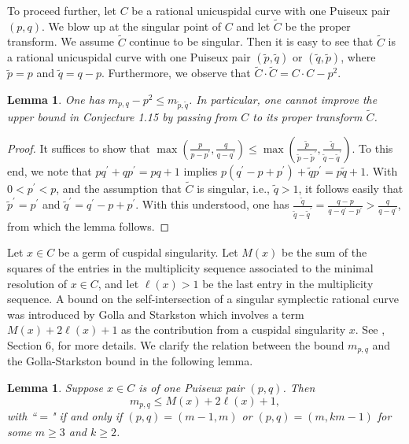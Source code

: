 \documentclass[11pt]{amsart}
\theoremstyle{plain}
\numberwithin{theorem}{section}
\newtheorem{lemma}[theorem]{Lemma}
\theoremstyle{definition}
\begin{document}
To proceed further, let $C$ be a rational unicuspidal curve with one Puiseux pair $(p,q)$. We blow up at the 
singular point of $C$ and let $\tilde{C}$ be the proper transform. We assume $\tilde{C}$ continue to be singular. 
Then it is easy to see that $\tilde{C}$ is a rational unicuspidal curve with one Puiseux pair $(\tilde{p},\tilde{q})$
or $(\tilde{q},\tilde{p})$, where $\tilde{p}=p$ and $\tilde{q}=q-p$. Furthermore, we observe that $\tilde{C}\cdot \tilde{C}=C\cdot C-p^2$.

\begin{lemma}
One has $m_{p,q}-p^2\leq m_{\tilde{p},\tilde{q}}$. In particular, one cannot improve the upper bound in 
Conjecture 1.15 by passing from $C$ to its proper transform $\tilde{C}$. 
\end{lemma}

\begin{proof}
It suffices to show that $\max (\frac{p}{p-p^\prime},\frac{q}{q-q^\prime})\leq 
\max (\frac{\tilde{p}}{\tilde{p}-\tilde{p}^\prime},\frac{\tilde{q}}{\tilde{q}-\tilde{q}^\prime})$. To this end, we note that
$pq^\prime+q p^\prime=pq+1$ implies $p(q^\prime-p+p^\prime) +\tilde{q} p^\prime=p\tilde{q}+1$. With
$0<p^\prime<p$, and the assumption that $\tilde{C}$ is singular, i.e., $\tilde{q}>1$, it follows easily that
$\tilde{p}^\prime=p^\prime$ and $\tilde{q}^\prime=q^\prime-p+p^\prime$. With this understood, one has 
$\frac{\tilde{q}}{\tilde{q}-\tilde{q}^\prime}=\frac{q-p}{q-q^\prime-p^\prime}>\frac{q}{q-q^\prime}$, from which the lemma follows.

\end{proof}

Let $x\in C$ be a germ of cuspidal singularity. Let $M(x)$ be the sum of the squares of the entries in the multiplicity sequence associated to the minimal resolution of $x\in C$, and let $\ell(x)>1$ be the last entry in the multiplicity sequence. A bound on the self-intersection of a singular symplectic rational curve was introduced by Golla and 
Starkston which involves a term $M(x)+2\ell(x)+1$ as the contribution from a cuspidal singularity $x$. 
See \cite{GS2}, Section 6,  for more details. We clarify the relation between the bound $m_{p,q}$ and the Golla-Starkston bound in the following lemma. 

\begin{lemma}
Suppose $x\in C$ is of one Puiseux pair $(p,q)$. Then 
$$
m_{p,q}\leq M(x)+2\ell(x)+1, 
$$
with ``$=$" if and only if $(p,q)=(m-1,m)$ or $(p,q)=(m, km-1)$ for some $m\geq 3$ and $k\geq 2$. 
\end{lemma}
\end{document}
